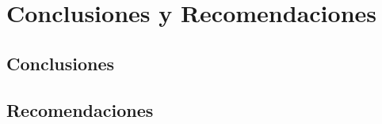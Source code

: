 \chapter{Conclusiones y Recomendaciones}
\label{chap:conclusions}

\section{Conclusiones}

\section{Recomendaciones}